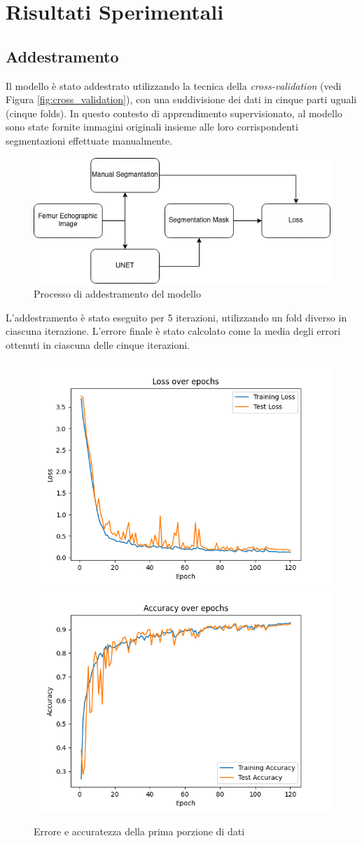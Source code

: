 \chapter{Risultati Sperimentali}
\label{chap:Risultati sperimentali}

\section{Addestramento}
\label{sec:Addestramento}

Il modello è stato addestrato utilizzando la tecnica della \textit{cross-validation} (vedi Figura
\ref{fig:cross_validation}), con una suddivisione dei dati in cinque parti uguali (cinque folds). In
questo contesto di apprendimento supervisionato, al modello sono state fornite immagini originali
insieme alle loro corrispondenti segmentazioni effettuate manualmente.

\begin{figure}[!ht]
    \centering
    \includegraphics[width=0.7\columnwidth]{Immagini/training.png}
    \caption{Processo di addestramento del modello}
    \label{fig:addestramento_del_modello}
\end{figure}

L'addestramento è stato eseguito per 5 iterazioni, utilizzando un fold diverso in ciascuna
iterazione. L'errore finale è stato calcolato come la media degli errori ottenuti in ciascuna delle
cinque iterazioni.


\begin{figure}[!ht]
    \centering
    \includegraphics[width=0.4\columnwidth]{Immagini/fold_0_loss.png} \includegraphics[width=0.4\columnwidth]{Immagini/fold_0_accuracy.png}
    \caption{Errore e accuratezza della prima porzione di dati}
    \label{fig:loss e accuratezza della prima porzione di dati}
\end{figure}

